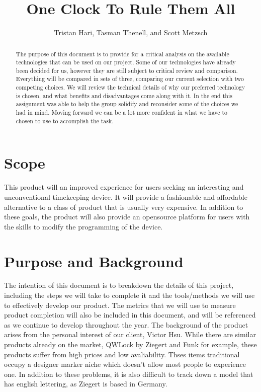 \documentclass[10pt,draftclsnofoot,onecolumn]{IEEEtran}
\begin{document}
\title{One Clock To Rule Them All}
\author{Tristan Hari, Tasman Thenell, and Scott Metzsch}
\maketitle
\begin{abstract}
The purpose of this document is to provide for a critical analysis on the available technologies that can be used on our project.
Some of our technologies have already been decided for us, however they are still subject to critical review and comparison.
Everything will be compared in sets of three, comparing our current selection with two competing choices.
We will review the technical details of why our preferred technology is chosen, and what benefits and disadvantages come along with it.
In the end this assignment was able to help the group solidify and reconsider some of the choices we had in mind.
Moving forward we can be a lot more confident in what we have to chosen to use to accomplish the task.
\end{abstract}

\newpage

\section{Scope}
This product will an improved experience for users seeking an interesting and unconventional timekeeping device.
It will provide a fashionable and affordable alternative to a class of product that is usually very expensive.
In addition to these goals, the product will also provide an opensource platform for users with the skills to modify the programming of the device.

\section{Purpose and Background}
The intention of this document is to breakdown the details of this project, including the steps we will take to complete it and the tools/methods we will use to effectively develop our product.
The metrics that we will use to measure product completion will also be included in this document, and will be referenced as we continue to develop throughout the year.
The background of the product arises from the personal interest of our client, Victor Hsu.
While there are similar products already on the market, QWLock by Ziegert and Funk for example, these products suffer from high prices and low avaliability.
Thses items traditional occupy a designer marker niche which doesn't allow most people to experience one.
In addition to these problems, it is also difficult to track down a model that has english lettering, as Ziegert is based in Germany.
\end{document}
